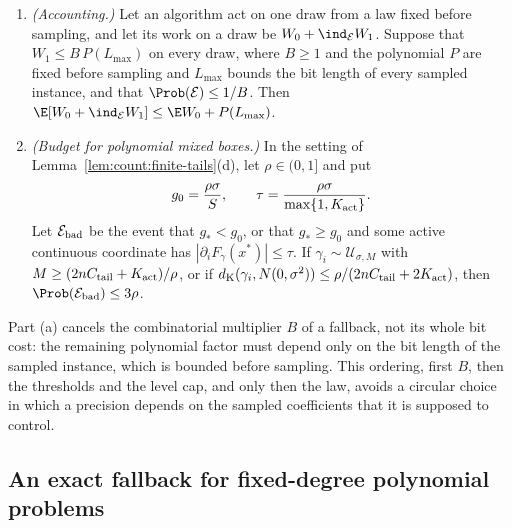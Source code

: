 \begin{lemma}\label{lem:count:rare-fallback}
\begin{enumerate}[label=(\alph*)]
\item \emph{(Accounting.)} Let an algorithm act on one draw from a law fixed
 before sampling, and let its work on a draw be $W_0+\ind_{\mathcal E}W_1$.
 Suppose that $W_1\le B\,P(L_{\max})$ on every draw, where $B\ge1$ and the
 polynomial $P$ are fixed before sampling and $L_{\max}$ bounds the bit length
 of every sampled instance, and that $\Prob(\mathcal E)\le1/B$. Then
 $\E[W_0+\ind_{\mathcal E}W_1]\le\E W_0+P(L_{\max})$.
\item \emph{(Budget for polynomial mixed boxes.)} In the setting of
 Lemma~\ref{lem:count:finite-tails}(d), let $\rho\in(0,1]$ and put
 \[
  g_0=\frac{\rho\sigma}{S},\qquad
  \tau=\frac{\rho\sigma}{\max\{1,K_{\rm act}\}} .
 \]
 Let $\mathcal E_{\rm bad}$ be the event that $g_*<g_0$, or that $g_*\ge g_0$
 and some active continuous coordinate has $|\partial_iF_\gamma(x^*)|\le\tau$.
 If $\gamma_i\sim\mathcal U_{\sigma,M}$ with
 $M\ge(2nC_{\rm tail}+K_{\rm act})/\rho$, or if
 $d_{\rm K}(\gamma_i,N(0,\sigma^2))\le\rho/(2nC_{\rm tail}+2K_{\rm act})$,
 then $\Prob(\mathcal E_{\rm bad})\le3\rho$.
\end{enumerate}
\end{lemma}

Part (a) cancels the combinatorial multiplier $B$ of a fallback, not its
whole bit cost: the remaining polynomial factor must depend only on the bit
length of the sampled instance, which is bounded before sampling. This
ordering, first $B$, then the thresholds and the level cap, and only then the
law, avoids a circular choice in which a precision depends on the sampled
coefficients that it is supposed to control.

\subsection{An exact fallback for fixed-degree polynomial problems}\label{sec:count:fallback}


